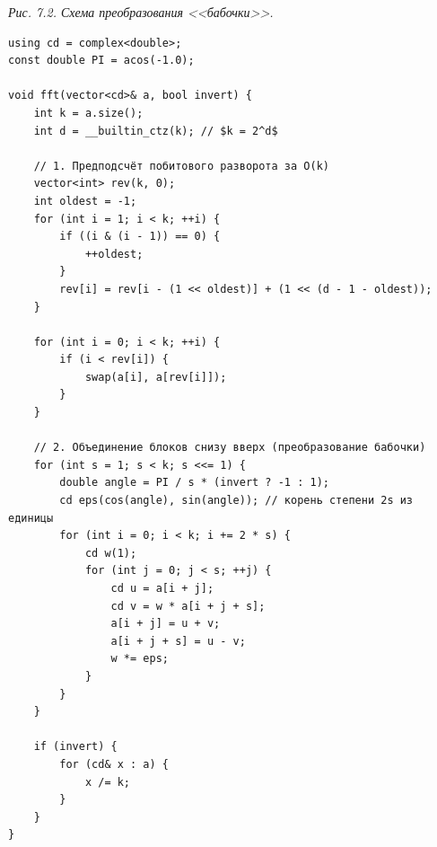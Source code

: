 \begin{center}
\par\nopagebreak\medskip
\small\textit{Рис. 7.2. Схема преобразования <<бабочки>>.}
\end{center}

\begin{lstlisting}[caption={Нерекурсивная реализация БПФ на месте (in-place)}]
using cd = complex<double>;
const double PI = acos(-1.0);

void fft(vector<cd>& a, bool invert) {
    int k = a.size();
    int d = __builtin_ctz(k); // $k = 2^d$

    // 1. Предподсчёт побитового разворота за O(k)
    vector<int> rev(k, 0);
    int oldest = -1;
    for (int i = 1; i < k; ++i) {
        if ((i & (i - 1)) == 0) {
            ++oldest;
        }
        rev[i] = rev[i - (1 << oldest)] + (1 << (d - 1 - oldest));
    }

    for (int i = 0; i < k; ++i) {
        if (i < rev[i]) {
            swap(a[i], a[rev[i]]);
        }
    }

    // 2. Объединение блоков снизу вверх (преобразование бабочки)
    for (int s = 1; s < k; s <<= 1) {
        double angle = PI / s * (invert ? -1 : 1);
        cd eps(cos(angle), sin(angle)); // корень степени 2s из единицы
        for (int i = 0; i < k; i += 2 * s) {
            cd w(1);
            for (int j = 0; j < s; ++j) {
                cd u = a[i + j];
                cd v = w * a[i + j + s];
                a[i + j] = u + v;
                a[i + j + s] = u - v;
                w *= eps;
            }
        }
    }

    if (invert) {
        for (cd& x : a) {
            x /= k;
        }
    }
}
\end{lstlisting}

